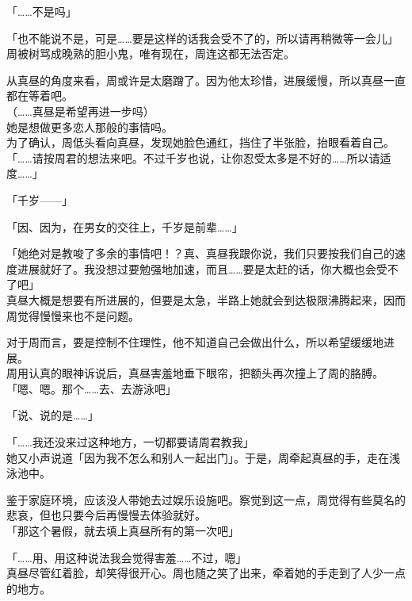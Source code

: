 「……不是吗」

「也不能说不是，可是……要是这样的话我会受不了的，所以请再稍微等一会儿」\\

周被树骂成晚熟的胆小鬼，唯有现在，周连这都无法否定。

从真昼的角度来看，周或许是太磨蹭了。因为他太珍惜，进展缓慢，所以真昼一直都在等着吧。\\

（……真昼是希望再进一步吗）\\

她是想做更多恋人那般的事情吗。\\

为了确认，周低头看向真昼，发现她脸色通红，挡住了半张脸，抬眼看着自己。\\

「……请按周君的想法来吧。不过千岁也说，让你忍受太多是不好的……所以请适度……」

「千岁——」

「因、因为，在男女的交往上，千岁是前辈……」

「她绝对是教唆了多余的事情吧！？真、真昼我跟你说，我们只要按我们自己的速度进展就好了。我没想过要勉强地加速，而且……要是太赶的话，你大概也会受不了吧」\\

真昼大概是想要有所进展的，但要是太急，半路上她就会到达极限沸腾起来，因而周觉得慢慢来也不是问题。

对于周而言，要是控制不住理性，他不知道自己会做出什么，所以希望缓缓地进展。\\

周用认真的眼神诉说后，真昼害羞地垂下眼帘，把额头再次撞上了周的胳膊。\\

「嗯、嗯。那个……去、去游泳吧」

「说、说的是……」

「……我还没来过这种地方，一切都要请周君教我」\\

她又小声说道「因为我不怎么和别人一起出门」。于是，周牵起真昼的手，走在浅泳池中。

鉴于家庭环境，应该没人带她去过娱乐设施吧。察觉到这一点，周觉得有些莫名的悲哀，但也只要今后再慢慢去体验就好。\\

「那这个暑假，就去填上真昼所有的第一次吧」

「……用、用这种说法我会觉得害羞……不过，嗯」\\

真昼尽管红着脸，却笑得很开心。周也随之笑了出来，牵着她的手走到了人少一点的地方。
